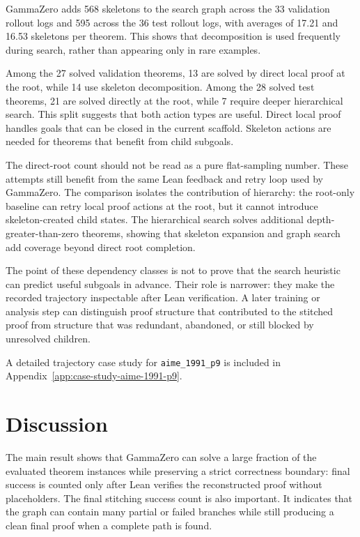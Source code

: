 \documentclass[en]{uet_awesome_thesis/uet-awesome-thesis}
\begin{document}
GammaZero adds 568 skeletons to the search graph across the 33 validation rollout logs and 595 across
the 36 test rollout logs, with averages of 17.21 and 16.53 skeletons per theorem. This shows that
decomposition is used frequently during search, rather than appearing only in rare examples.

Among the 27 solved validation theorems, 13 are solved by direct local proof at the root, while 14 use
skeleton decomposition. Among the 28 solved test theorems, 21 are solved directly at the root, while 7
require deeper hierarchical search. This split suggests that both action types are useful. Direct local
proof handles goals that can be closed in the current scaffold. Skeleton actions are needed for theorems
that benefit from child subgoals.

The direct-root count should not be read as a pure flat-sampling number. These attempts still benefit
from the same Lean feedback and retry loop used by GammaZero. The comparison isolates the contribution
of hierarchy: the root-only baseline can retry local proof actions at the root, but it cannot introduce
skeleton-created child states. The hierarchical search solves additional depth-greater-than-zero theorems,
showing that skeleton expansion and graph search add coverage beyond direct root completion.

The point of these dependency classes is not to prove that the search heuristic can predict useful
subgoals in advance. Their role is narrower: they make the recorded trajectory inspectable after Lean
verification. A later training or analysis step can distinguish proof structure that contributed to the
stitched proof from structure that was redundant, abandoned, or still blocked by unresolved children.

A detailed trajectory case study for \texttt{aime\_1991\_p9} is included in Appendix~\ref{app:case-study-aime-1991-p9}.

\section{Discussion}

The main result shows that GammaZero can solve a large fraction of the evaluated theorem instances while preserving a strict correctness boundary: final success is counted only after Lean verifies the reconstructed proof without placeholders. The final stitching success count is also important. It indicates that the graph can contain many partial or failed branches while still producing a clean final proof when a complete path is found.
\end{document}
